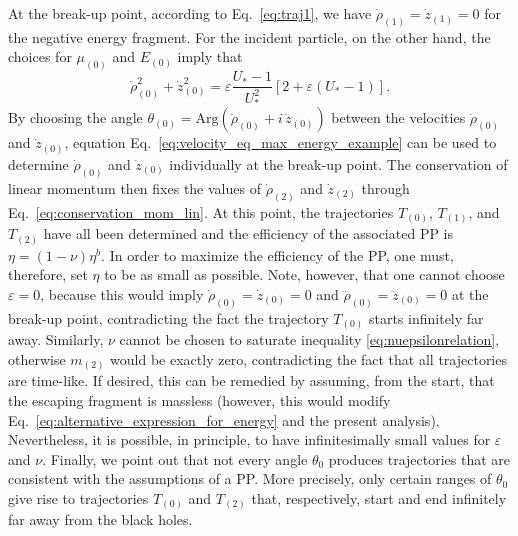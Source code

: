 At the break-up point, according to Eq.~\eqref{eq:traj1}, we have $\dot \rho_{(1)}=\dot z_{(1)} = 0$ for the negative energy fragment. For the incident particle, on the other hand, the choices for $\mu_{(0)}$ and $E_{(0)}$ imply that
%
\begin{equation}\label{eq:velocity_eq_max_energy_example}
  \dot \rho_{(0)} ^2 + \dot z_{(0)} ^2 = \varepsilon \frac{U_*-1}{U_* ^2} \left[2 + \varepsilon (U_* - 1) \right].
\end{equation}
%
By choosing the angle $\theta_{(0)} = \mathrm{Arg}\left(\dot \rho_{(0)} + i \, \dot z_{(0)} \right)$ between the velocities $\dot \rho_{(0)}$ and $\dot z_{(0)}$, equation Eq.~\eqref{eq:velocity_eq_max_energy_example} can be used to determine $\dot \rho_{(0)}$ and $\dot z_{(0)}$ individually at the break-up point. The conservation of linear momentum then fixes the values of $\dot \rho_{(2)}$ and $\dot z_{(2)}$ through Eq.~\eqref{eq:conservation_mom_lin}. At this point, the trajectories $T_{(0)}$, $T_{(1)}$, and $T_{(2)}$ have all been determined and the efficiency of the associated \ac{PP} is $\eta=(1-\nu)\eta^{b}$.  In order to maximize the efficiency of the \ac{PP}, one must, therefore, set $\eta$ to be as small as possible. Note, however, that one cannot choose $\varepsilon=0$, because this would imply $\dot \rho_{(0)} = \dot z_{(0)} = 0$ and  $\ddot \rho_{(0)} = \ddot z_{(0)} = 0$ at the break-up point, contradicting the fact the trajectory $T_{(0)}$ starts infinitely far away. Similarly, $\nu$ cannot be chosen to saturate inequality \eqref{eq:nuepsilonrelation}, otherwise $m_{(2)}$ would be exactly zero, contradicting the fact that all trajectories are time-like. If desired, this can be remedied by assuming, from the start, that the escaping fragment is massless (however, this would modify Eq.~\eqref{eq:alternative_expression_for_energy} and the present analysis). Nevertheless, it is possible, in principle, to have infinitesimally small values for $\varepsilon$ and $\nu$. Finally, we point out that not every angle $\theta_0$ produces trajectories that are consistent with the assumptions of a \ac{PP}. More precisely, only certain ranges of $\theta_0$ give rise to trajectories  $T_{(0)}$ and $T_{(2)}$ that, respectively, start and end infinitely far away from the black holes.

